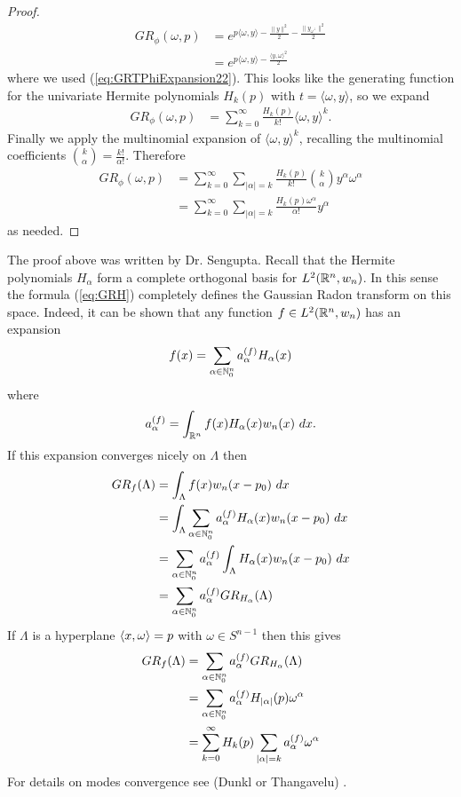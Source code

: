 \begin{proof}
  \begin{align*}
    GR_{\phi}(\omega, p) 
      &= e^{p \langle \omega, y\rangle - \frac{\|y\|^2}2-\frac{\|y_{\omega^\perp}\|^2}2}
    \\
      &= e^{p \langle \omega, y\rangle - \frac{\langle y, \omega\rangle^2}2}
  \end{align*}
  where we used (\ref{eq:GRTPhiExpansion22}). This looks like the generating function for the univariate Hermite polynomials $H_k(p)$ with $t = \langle \omega, y \rangle$, so we expand
  \begin{align*}
    GR_{\phi}(\omega, p) 
      &= \sum_{k = 0}^\infty \frac{H_k(p)}{k!} \langle \omega, y\rangle^k.
  \end{align*}
  Finally we apply the multinomial expansion of $\langle \omega, y\rangle^k$, recalling the multinomial coefficients $\binom{k}{\alpha} = \frac{k!}{\alpha!}$. Therefore
  \begin{align*}
    GR_{\phi}(\omega, p)
      &= \sum_{k = 0}^\infty \sum_{|\alpha| = k} \frac{H_k(p)}{k!} \binom{k}\alpha y^\alpha\omega^\alpha
    \\
      &= \sum_{k = 0}^\infty \sum_{|\alpha| = k} \frac{H_k(p)\omega^\alpha}{\alpha!} y^\alpha
  \end{align*}
  as needed.
\end{proof}

\begin{remark}
  The proof above was written by Dr. Sengupta. Recall that the Hermite polynomials $H_\alpha$ form a complete orthogonal basis for $L^2(\mathbb{R}^n, w_n)$. In this sense the formula (\ref{eq:GRH}) completely defines the Gaussian Radon transform on this space. Indeed, it can be shown that any function $f \in L^2(\mathbb{R}^n, w_n)$ has an expansion
  \[
    f(x) = \sum_{\alpha \in \mathbb{N}_0^n} a^{(f)}_\alpha H_\alpha(x)
  \]
  where
  \[
    a_\alpha^{(f)} = \int_{\mathbb{R}^n} f(x)H_\alpha(x) w_n(x) ~dx.
  \]
  If this expansion converges nicely on $\Lambda$ then
  \begin{align*}
    GR_f(\Lambda) 
    &= \int_\Lambda f(x) w_n(x-p_0)~dx 
    \\ 
    &= \int_\Lambda \sum_{\alpha \in \mathbb{N}_0^n} a_\alpha^{(f)} H_\alpha(x) w_n(x-p_0) ~dx
    \\
    &= \sum_{\alpha \in \mathbb{N}_0^n} a_\alpha^{(f)} \int_\Lambda H_\alpha(x) w_n(x-p_0) ~dx
    \\
    &= \sum_{\alpha \in \mathbb{N}_0^n} a_\alpha^{(f)} GR_{H_\alpha}(\Lambda)
  \end{align*}
  If $\Lambda$ is a hyperplane $\left\langle x, \omega \right\rangle = p$ with $\omega \in S^{n-1}$ then this gives
  \begin{align*}
    GR_f(\Lambda) 
    &= \sum_{\alpha \in \mathbb{N}_0^n} a_\alpha^{(f)} GR_{H_\alpha}(\Lambda)
    \\
    &= \sum_{\alpha \in \mathbb{N}_0^n} a_\alpha^{(f)} H_{|\alpha|}(p) \omega^\alpha
    \\
    &= \sum_{k=0}^\infty H_k(p) \sum_{|\alpha| = k} a_\alpha^{(f)} \omega^\alpha
  \end{align*}
  For details on modes convergence see (Dunkl or Thangavelu) \cn. 
\end{remark}

